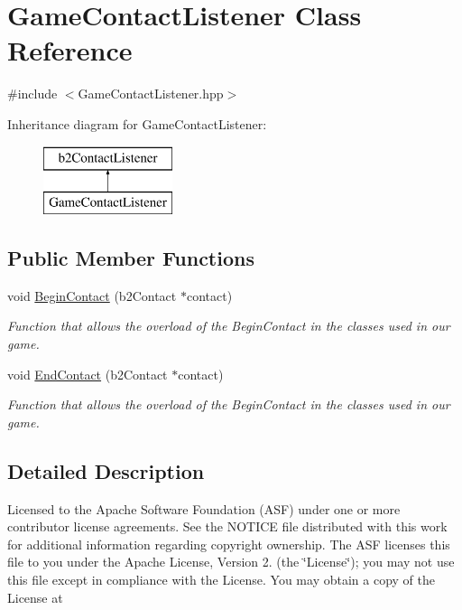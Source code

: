 \hypertarget{class_game_contact_listener}{\section{Game\+Contact\+Listener Class Reference}
\label{class_game_contact_listener}
}


{\ttfamily \#include $<$Game\+Contact\+Listener.\+hpp$>$}

Inheritance diagram for Game\+Contact\+Listener\+:\begin{figure}[H]
\begin{center}
\leavevmode
\includegraphics[height=2.000000cm]{class_game_contact_listener}
\end{center}
\end{figure}
\subsection*{Public Member Functions}
\begin{DoxyCompactItemize}
\item 
void \hyperlink{class_game_contact_listener_a3a66eddc0010a96f83a0cb61d3835cc7}{Begin\+Contact} (b2\+Contact $\ast$contact)
\begin{DoxyCompactList}\small\item\em Function that allows the overload of the Begin\+Contact in the classes used in our game. \end{DoxyCompactList}\item 
void \hyperlink{class_game_contact_listener_a2d754e57a4f6c88541853a506ec3b10d}{End\+Contact} (b2\+Contact $\ast$contact)
\begin{DoxyCompactList}\small\item\em Function that allows the overload of the Begin\+Contact in the classes used in our game. \end{DoxyCompactList}\end{DoxyCompactItemize}


\subsection{Detailed Description}
Licensed to the Apache Software Foundation (A\+S\+F) under one or more contributor license agreements. See the N\+O\+T\+I\+C\+E file distributed with this work for additional information regarding copyright ownership. The A\+S\+F licenses this file to you under the Apache License, Version 2. (the \char`\"{}\+License\char`\"{}); you may not use this file except in compliance with the License. You may obtain a copy of the License at

